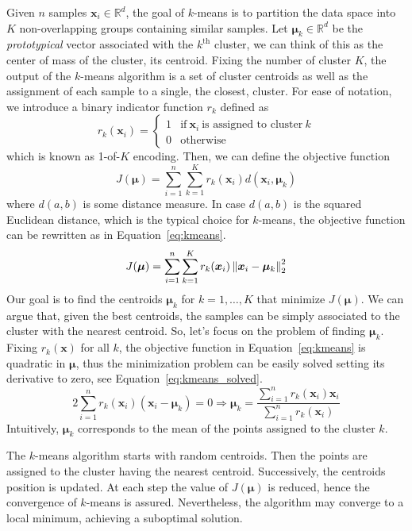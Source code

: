 	Given $n$ samples $\bm{x}_i \in \mathbb{R}^d$, the goal of $k$-means is to partition the data space into $K$ non-overlapping groups containing similar samples.
    Let $\bm{\mu}_k \in \mathbb{R}^d$ be the \textit{prototypical} vector associated with the $k^{\text{th}}$ cluster, we can think of this as the center of mass of the cluster, \ie its centroid.
    Fixing the number of cluster $K$, the output of the $k$-means algorithm is a set of cluster centroids as well as the assignment of each sample to a single, \ie the closest, cluster.
    For ease of notation, we introduce a binary indicator function $r_k$ defined as
    $$
 	r_k(\bm{x}_i)=\begin{cases} 1  &\text{if}~\bm{x}_i~\text{is assigned to cluster}~k \\ 0  & \text{otherwise} \end{cases}
    $$
    which is known as 1-of-$K$ encoding. Then, we can define the objective function
    $$
    J(\bm{\mu}) = \sum_{i=1}^n\sum_{k=1}^K r_k(\bm{x}_i) d(\bm{x}_i, \bm{\mu}_k)
    $$
    where $d(a,b)$ is some distance measure. In case $d(a,b)$ is the squared Euclidean distance, which is the typical choice for $k$-means, the objective function can be rewritten as in Equation~\eqref{eq:kmeans}.
    \begin{equation} \label{eq:kmeans}
    J(\bm{\mu}) = \sum_{i=1}^n\sum_{k=1}^K r_k(\bm{x}_i) \left\lVert\bm{x}_i- \bm{\mu}_k\right\rVert_2^2
    \end{equation}
    Our goal is to find the centroids $\bm{\mu}_k$ for $k=1,\dots,K$ that minimize $J(\bm{\mu})$.
    We can argue that, given the best centroids, the samples can be simply associated to the cluster with the nearest centroid. So, let's focus on the problem of finding $\bm{\mu}_k$.
    Fixing $r_k(\bm{x})$ for all $k$, the objective function in Equation~\eqref{eq:kmeans} is quadratic in $\bm{\mu}$, thus the minimization problem can be easily solved setting its derivative to zero, see Equation~\eqref{eq:kmeans_solved}.
    \begin{equation} \label{eq:kmeans_solved}
	2\sum_{i=1}^n r_k(\bm{x}_i)(\bm{x}_i - \bm{\mu}_k) = 0 \Rightarrow \bm{\mu}_k = \frac{\sum_{i=1}^n r_k(\bm{x}_i)\bm{x}_i}{\sum_{i=1}^nr_k(\bm{x}_i)}
    \end{equation}
    Intuitively, $\bm{\mu}_k$ corresponds to the mean of the points assigned to the cluster $k$.
    
    The $k$-means algorithm starts with random centroids. Then the points are assigned to the cluster having the nearest centroid. Successively, the centroids position is updated. At each step the value of $J(\bm{\mu})$ is reduced, hence the convergence of $k$-means is assured. Nevertheless, the algorithm may converge to a local minimum, achieving a suboptimal solution.
    
